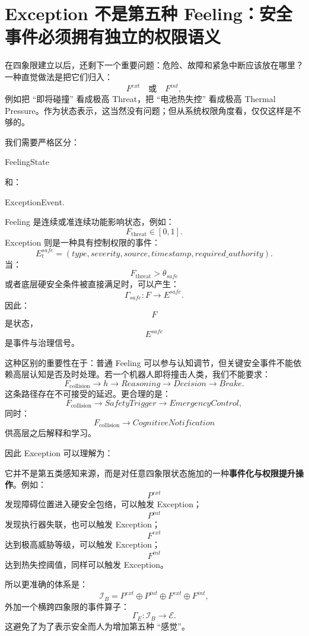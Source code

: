 \section{Exception 不是第五种 Feeling：安全事件必须拥有独立的权限语义}
\label{sec:exception-not-feeling}

在四象限建立以后，还剩下一个重要问题：危险、故障和紧急中断应该放在哪里？一种直觉做法是把它们归入：
\[
F^{ext}
\quad\text{或}\quad
F^{int},
\]
例如把 ``即将碰撞'' 看成极高 Threat，把 ``电池热失控'' 看成极高 Thermal Pressure。作为状态表示，这当然没有问题；但从系统权限角度看，仅仅这样是不够的。

我们需要严格区分：
\begin{statementbox}
FeelingState
\end{statementbox}
和：
\begin{statementbox}
ExceptionEvent.
\end{statementbox}
Feeling 是连续或准连续功能影响状态，例如：
\[
F_{\mathrm{threat}}\in[0,1].
\]
Exception 则是一种具有控制权限的事件：
\[
E^{safe}_t
=
(
type,
severity,
source,
timestamp,
required\_authority
).
\]
当：
\[
F_{\mathrm{threat}}>\theta_{safe}
\]
或者底层硬安全条件被直接满足时，可以产生：
\[
\Gamma_{safe}:
F
\rightarrow
E^{safe}.
\]
因此：
\[
F
\]
是状态，
\[
E^{safe}
\]
是事件与治理信号。

这种区别的重要性在于：普通 Feeling 可以参与认知调节，但关键安全事件不能依赖高层认知是否及时处理。若一个机器人即将撞击人类，我们不能要求：
\[
F_{\mathrm{collision}}
\rightarrow
h
\rightarrow
Reasoning
\rightarrow
Decision
\rightarrow
Brake.
\]
这条路径存在不可接受的延迟。更合理的是：
\[
F_{\mathrm{collision}}
\rightarrow
SafetyTrigger
\rightarrow
EmergencyControl,
\]
同时：
\[
F_{\mathrm{collision}}
\rightarrow
CognitiveNotification
\]
供高层之后解释和学习。

因此 Exception 可以理解为：
\begin{statementbox}
\centering
{}
\end{statementbox}
它并不是第五类感知来源，而是对任意四象限状态施加的一种\textbf{事件化与权限提升操作}。例如：
\[
P^{ext}
\]
发现障碍位置进入硬安全包络，可以触发 Exception；
\[
P^{int}
\]
发现执行器失联，也可以触发 Exception；
\[
F^{ext}
\]
达到极高威胁等级，可以触发 Exception；
\[
F^{int}
\]
达到热失控阈值，同样可以触发 Exception。

所以更准确的体系是：
\[
\mathcal I_B
=
P^{ext}
\oplus
P^{int}
\oplus
F^{ext}
\oplus
F^{int},
\]
外加一个横跨四象限的事件算子：
\[
\boxed{
\Gamma_E:
\mathcal I_B
\rightarrow
\mathcal E.
}
\]
这避免了为了表示安全而人为增加第五种 ``感觉''。

